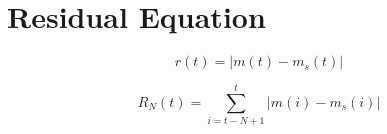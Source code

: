 \documentclass{article}
\begin{document}
\section{Residual Equation}

\[
r(t) = \left|m(t) - m_s(t)\right|
\]

\[
R_N(t) = \sum_{i=t-N+1}^{t} \left|m(i) - m_s(i)\right|
\]
\end{document}
